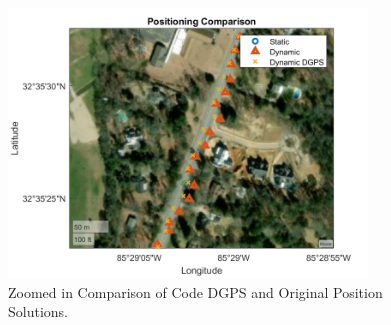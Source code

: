 \documentclass[11pt]{article}
\begin{document}
\begin{enumerate}[label=\textbf{\arabic*.}]
    \begin{figure}[H]
        \centering
        \includegraphics[width=0.85\textwidth]{p4_e.png}
        \caption{Zoomed in Comparison of Code DGPS and Original Position Solutions.}
    \end{figure}

\end{enumerate}
\end{document}

